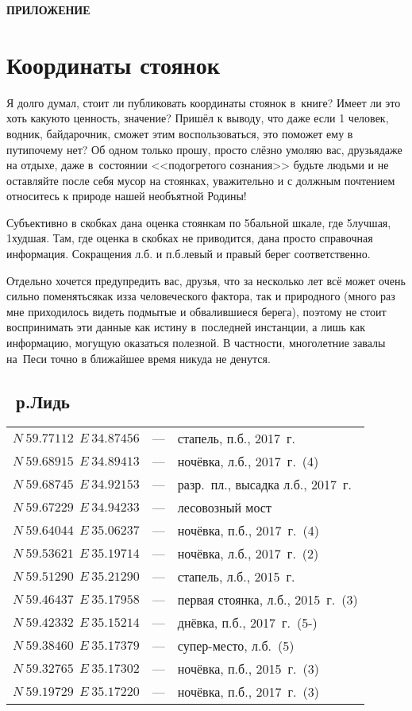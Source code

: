 \afterpage{\blankpage}
\newpage
\appendix
\pagestyle{empty}
{\hfill\large\textbf{ПРИЛОЖЕНИЕ}}
\section*{Координаты стоянок}
Я долго думал, стоит ли публиковать координаты стоянок в~книге? Имеет ли это хоть какую\sdash то ценность, значение? Пришёл к выводу, что даже если 1 человек, водник, байдарочник, сможет этим воспользоваться, это поможет ему в пути\mdash почему нет? Об одном только прошу, просто слёзно умоляю вас, друзья\mdash даже на отдыхе, даже в~состоянии <<подогретого сознания>> будьте людьми и не оставляйте после себя мусор на стоянках, уважительно и с должным почтением относитесь к природе нашей необъятной Родины! 

Субъективно в скобках дана оценка стоянкам по 5\sdash бальной шкале, где 5\mdash лучшая, 1\mdash худшая. Там, где оценка в скобках не приводится, дана просто справочная информация. Сокращения л.б. и п.б.\mdash левый и правый берег соответственно.

Отдельно хочется предупредить вас, друзья, что за несколько лет всё может очень сильно поменяться\mdash как из\sdash за человеческого фактора, так и природного (много раз мне приходилось видеть подмытые и обвалившиеся берега), поэтому не стоит воспринимать эти данные как истину в~последней инстанции, а лишь как информацию, могущую оказаться полезной. В частности, многолетние завалы на~Песи точно в ближайшее время никуда не денутся.

\newpage 
\subsection*{~р.Лидь}
\begin{longtable}[c]{>{\raggedright}m{40mm} >{\raggedleft}m{7mm}>{\raggedright}p{65mm} }		
${N~59.77112~~E~34.87456}$ & --- & стапель, п.б., 2017~г.\tabularnewline
${N~59.68915~~E~34.89413}$ & --- & ночёвка, л.б., 2017~г.~(4)\tabularnewline
${N~59.68745~~E~34.92153}$ & --- & разр.~пл., высадка л.б., 2017~г.\tabularnewline
${N~59.67229~~E~34.94233}$ & --- & лесовозный мост\tabularnewline
${N~59.64044~~E~35.06237}$ & --- & ночёвка, п.б., 2017~г.~(4)\tabularnewline
${N~59.53621~~E~35.19714}$ & --- & ночёвка, л.б., 2017~г.~(2)\tabularnewline
${N~59.51290~~E~35.21290}$ & --- & стапель, л.б., 2015~г.\tabularnewline
${N~59.46437~~E~35.17958}$ & --- & первая стоянка, л.б., 2015~г.~(3)\tabularnewline
${N~59.42332~~E~35.15214}$ & --- & днёвка, п.б., 2017~г.~(5-)\tabularnewline
${N~59.38460~~E~35.17379}$ & --- & супер-место, л.б.~(5)\tabularnewline
${N~59.32765~~E~35.17302}$ & --- & ночёвка, п.б., 2015~г.~(3)\tabularnewline 
${N~59.19729~~E~35.17220}$ & --- & ночёвка, п.б., 2017~г.~(3)\tabularnewline
\end{longtable}

